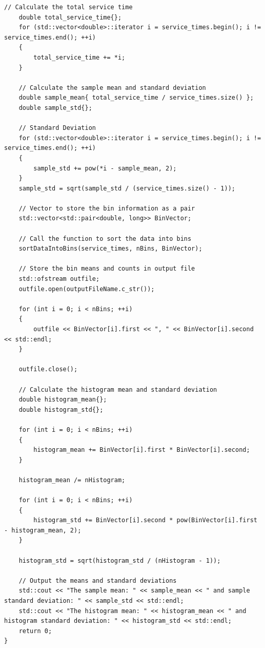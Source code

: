 \begin{lstlisting}[style=CStyle]
	// Calculate the total service time
	double total_service_time{};
	for (std::vector<double>::iterator i = service_times.begin(); i != service_times.end(); ++i)
	{
		total_service_time += *i;
	}
	
	// Calculate the sample mean and standard deviation
	double sample_mean{ total_service_time / service_times.size() };
	double sample_std{};
	
	// Standard Deviation
	for (std::vector<double>::iterator i = service_times.begin(); i != service_times.end(); ++i)
	{
		sample_std += pow(*i - sample_mean, 2);
	}
	sample_std = sqrt(sample_std / (service_times.size() - 1));

	// Vector to store the bin information as a pair
	std::vector<std::pair<double, long>> BinVector;

	// Call the function to sort the data into bins
	sortDataIntoBins(service_times, nBins, BinVector);

	// Store the bin means and counts in output file
	std::ofstream outfile;
	outfile.open(outputFileName.c_str());
	
	for (int i = 0; i < nBins; ++i)
	{
		outfile << BinVector[i].first << ", " << BinVector[i].second << std::endl;
	}
	
	outfile.close();
	
	// Calculate the histogram mean and standard deviation
	double histogram_mean{};
	double histogram_std{};
	
	for (int i = 0; i < nBins; ++i)
	{
		histogram_mean += BinVector[i].first * BinVector[i].second;
	}
	
	histogram_mean /= nHistogram;
	
	for (int i = 0; i < nBins; ++i)
	{
		histogram_std += BinVector[i].second * pow(BinVector[i].first - histogram_mean, 2);
	}
	
	histogram_std = sqrt(histogram_std / (nHistogram - 1));
	
	// Output the means and standard deviations
	std::cout << "The sample mean: " << sample_mean << " and sample standard deviation: " << sample_std << std::endl;
	std::cout << "The histogram mean: " << histogram_mean << " and histogram standard deviation: " << histogram_std << std::endl;
	return 0;
}
\end{lstlisting}